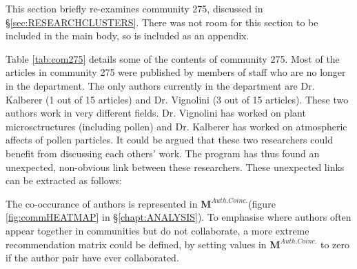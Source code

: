 \label{sec:neonicotinoids}
This section briefly re-examines community 275, discussed in \S\ref{sec:RESEARCHCLUSTERS}. There was not room for this section to be included in the main body, so is included as an appendix. 

Table \ref{tab:com275} details some of the contents of community 275. Most of the articles in community 275 were published by members of staff who are no longer in the department. The only authors currently in the department are Dr. Kalberer (1 out of 15 articles) and Dr. Vignolini (3 out of 15 articles). These two authors work in very different fields. Dr. Vignolini has worked on plant microsctructures (including pollen) and Dr. Kalberer has worked on atmospheric affects of pollen particles. It could be argued that these two researchers could benefit from discussing each others' work. The program has thus found an unexpected, non-obvious link between these researchers. These unexpected links can be extracted as follows:

The co-occurance of authors is represented in $\mathbf{M}^{Auth. Coinc.}$(figure \ref{fig:commHEATMAP} in \S\ref{chapt:ANALYSIS}). To emphasise where authors often appear together in communities but do not collaborate, a more extreme recommendation matrix could be defined, by setting values in $\mathbf{M}^{Auth. Coinc.}$ to zero if the author pair have ever collaborated. 

